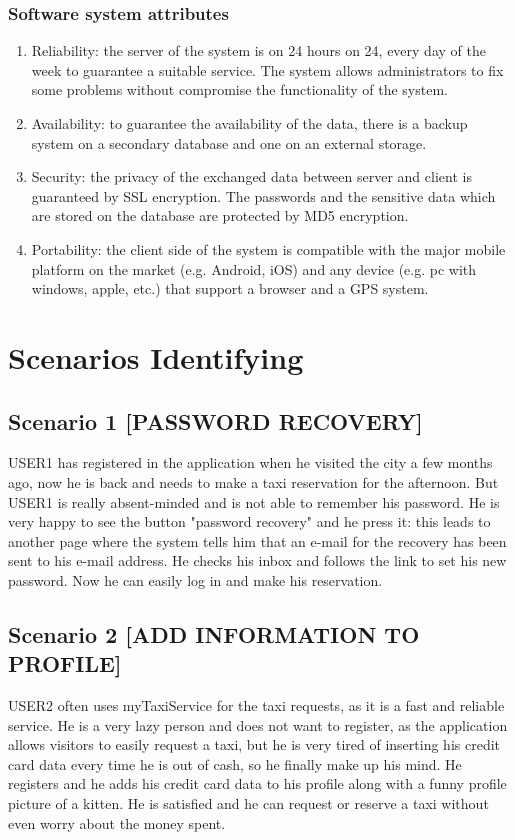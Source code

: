 \documentclass[18pt,oneside,a4paper, titlepage]{article}
\begin{document}
		\subsubsection{Software system attributes}
			\begin{enumerate}
				\item Reliability: the server of the system is on 24 hours on 24, every day of the week to guarantee a suitable service. The system allows administrators to fix some problems without compromise the functionality of the system.
				\item Availability: to guarantee the availability of the data, there is a backup system on a secondary database and one on an external storage. 
				\item Security: the privacy of the exchanged data between server and client is guaranteed by SSL encryption. The passwords and the sensitive data which are stored on the database are protected by MD5 encryption.
				\item Portability: the client side of the system is compatible with the major mobile platform on the market (e.g. Android, iOS) and any device (e.g. pc with windows, apple, etc.) that support a browser and a GPS system.
			\end{enumerate}
\newpage
\section{Scenarios Identifying}
	\subsection{Scenario 1 [PASSWORD RECOVERY]}
		USER1 has registered in the application when he visited the city a few months ago, now he is back and needs to make a taxi reservation for the afternoon. But USER1 is really absent-minded and is not able to remember his password. He is very happy to see the button "password recovery" and he press it: this leads to another page where the system tells him that an e-mail for the recovery has been sent to his e-mail address. He checks his inbox and follows the link to set his new password. Now he can easily log in and make his reservation.
		
	\subsection{Scenario 2 [ADD INFORMATION TO PROFILE]}
		USER2 often uses myTaxiService for the taxi requests, as it is a fast and reliable service. He is a very lazy person and does not want to register, as the application allows visitors to easily request a taxi, but he is very tired of inserting his credit card data every time he is out of cash, so he finally make up his mind. He registers and he adds his credit card data to his profile along with a funny profile picture of a kitten. He is satisfied and he can request or reserve a taxi without even worry about the money spent.
	
\end{document}
